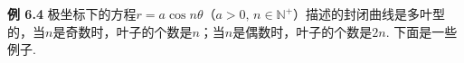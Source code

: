 \documentclass{article}
\begin{document}
\textbf{例 6.4} 极坐标下的方程$r=a\cos{n\theta}$（$a>0,\,n\in \mathbb{N}^{+}$）描述的封闭曲线是多叶型的，当$n$是奇数时，叶子的个数是$n$；当$n$是偶数时，叶子的个数是$2n$. 下面是一些例子.

\begin{figure}[htbp]
  \hfill
\end{figure}
\end{document}
